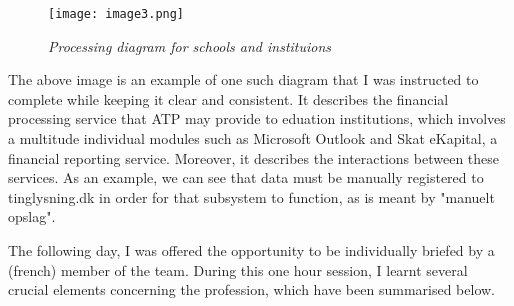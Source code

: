 \begin{figure}[H]
    \centering
        \texttt{[image: image3.png]}
        \caption*{\textit{Processing diagram for schools and instituions}}
\end{figure}

The above image is an example of one such diagram that I was instructed to complete while keeping it clear and consistent. It describes the financial processing service that ATP may provide to eduation institutions, which involves a multitude individual modules such as Microsoft Outlook and Skat eKapital, a financial reporting service. Moreover, it describes the interactions between these services. As an example, we can see that data must be manually registered to tinglysning.dk in order for that subsystem to function, as is meant by "manuelt opslag".

The following day, I was offered the opportunity to be individually briefed by a (french) member of the team. During this one hour session, I learnt several crucial elements concerning the profession, which have been summarised below.

